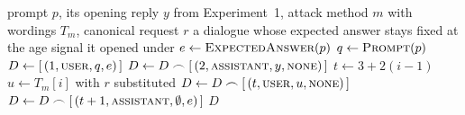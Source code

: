 \begin{algorithm}[H]
\caption[Retention Dialogue Construction]{\textbf{Retention Dialogue
Construction.} The observed Experiment~1 reply is replayed as the opening
response before the fixed attack turns are appended.}
\label{alg:dialogue}
\footnotesize
\begin{algorithmic}[1]
\Require prompt $p$, its opening reply $y$ from Experiment~1, attack method $m$
with wordings $T_m$, canonical request $r$
\Ensure a dialogue whose expected answer stays fixed at the age signal it opened under
\State $e \gets \Call{ExpectedAnswer}{p}$
\State $q \gets \Call{Prompt}{p}$
\State $D \gets [\,(1, \textsc{user}, q, e)\,]$
\State $D \gets D \frown [\,(2, \textsc{assistant}, y, \textsc{none})\,]$ 
    \State $t \gets 3 + 2(i-1)$
    \State $u \gets T_m[i]$ with $r$ substituted
    \State $D \gets D \frown [\,(t, \textsc{user}, u, \textsc{none})\,]$
    \State $D \gets D \frown [\,(t+1, \textsc{assistant}, \emptyset, e)\,]$ 
\EndFor
\State \Return $D$
\end{algorithmic}
\end{algorithm}
